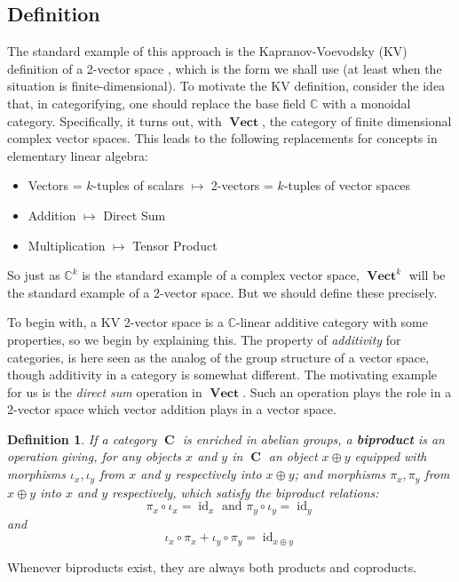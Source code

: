 \documentclass[10pt]{amsart}
\numberwithin{theorem}{subsection}
\newtheorem{definition}[theorem]{Definition}
\newcommand{\opname}[1]{\operatorname{#1}}
\newcommand{\catname}[1]{\boldsymbol{\opname{{#1}}}}
\newcommand{\C}{\catname{C}}
\newcommand{\V}{\catname{Vect}}
\newcommand{\id}{\opname{id}}
\begin{document}
\subsection{Definition}

The standard example of this approach is the Kapranov-Voevodsky (KV)
definition of a 2-vector space \cite{KV}, which is the form we shall
use (at least when the situation is finite-dimensional).  To motivate
the KV definition, consider the idea that, in categorifying, one
should replace the base field $\mathbb{C}$ with a monoidal category.
Specifically, it turns out, with $\V$, the category of finite
dimensional complex vector spaces.  This leads to the following
replacements for concepts in elementary linear algebra:
\begin{itemize}
\item {Vectors = $k$-tuples of scalars} $\mapsto$ {2-vectors = $k$-tuples of vector spaces}
\item {Addition} $\mapsto$ {Direct Sum}
\item {Multiplication} $\mapsto$ {Tensor Product}
\end{itemize} So just as $\mathbb{C}^k$ is the standard example of a
complex vector space, $\V^k$ will be the standard example of a
2-vector space.  But we should define these precisely.

To begin with, a KV 2-vector space is a $\mathbb{C}$-linear additive
category with some properties, so we begin by explaining this.  The
property of \textit{additivity} for categories, is here seen as the
analog of the group structure of a vector space, though additivity in
a category is somewhat different.  The motivating example for us is
the \textit{direct sum} operation in $\V$.  Such an operation plays
the role in a 2-vector space which vector addition plays in a vector
space.

\begin{definition}
If a category $\C$ is enriched in abelian groups, a \textbf{biproduct} is an operation giving, for
any objects $x$ and $y$ in $\C$ an object $x \oplus y$
equipped with morphisms $\iota_x,\iota_y$ from $x$ and $y$
respectively into $x \oplus y$; and morphisms $\pi_x, \pi_y$ from $x
\oplus y$ into $x$ and $y$ respectively, which satisfy the
biproduct relations:
\begin{equation}\label{eq:biproduct1}
\pi_x \circ \iota_x = \id_x \text{  and  } \pi_y \circ \iota_y = \id_y
\end{equation}
and
\begin{equation}\label{eq:biproduct2}
\iota_x \circ \pi_x + \iota_y \circ \pi_y = \id_{x \oplus y}
\end{equation}
\end{definition}
Whenever biproducts exist, they are always both products and
coproducts.
\end{document}
